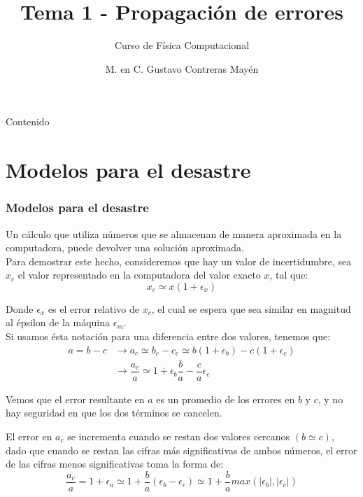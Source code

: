 \documentclass[12pt]{beamer}
\title{Tema 1 - Propagaci\'{o}n de errores}
\subtitle{Curso de F\'{i}sica Computacional}
\author{M. en C. Gustavo Contreras May\'{e}n}
\date{}
\begin{document}
\maketitle
\fontsize{14}{14}\selectfont
{}
\begin{frame}{Contenido}
\tableofcontents[pausesections]
\end{frame}
\section{Modelos para el desastre}
\begin{frame}
\frametitle{Modelos para el desastre}
Un c\'{a}lculo que utiliza n\'{u}meros que se almacenan de manera aproximada en la computadora, puede devolver una soluci\'{o}n aproximada.
\\
\bigskip
Para demostrar este hecho, consideremos que hay un valor de incertidumbre, sea $x_{c}$ el valor representado en la computadora del valor exacto $x$, tal que:
\[x_{c} \simeq  x(1+\epsilon_{x}) \]
\end{frame}
\begin{frame}
Donde $\epsilon_{x}$ es el error relativo de $x_{c}$, el cual se espera que sea similar en magnitud al \'{e}psilon de la m\'{a}quina $\epsilon_{m}$.
\\
\bigskip
Si usamos \'{e}sta notación para una diferencia entre dos valores, tenemos que:
\begin{eqnarray*}
a=b-c & \rightarrow a_{c} \simeq b_{c} - c_{c} \simeq b(1+\epsilon_{b}) - c(1+\epsilon_{c}) \\
{} & \rightarrow \dfrac{a_{c}}{a} \simeq 1 + \epsilon_{b} \dfrac{b}{a} - \dfrac{c}{a} \epsilon_{c}
\end{eqnarray*} 
\end{frame}
\begin{frame}
Vemos que el error resultante en $a$ es un promedio de los errores en $b$ y $c$, y no hay seguridad en que los dos t\'{e}rminos se cancelen.
\end{frame}
\begin{frame}
El error en $a_{c}$ se incrementa cuando se restan dos valores cercanos $(b \simeq c)$, dado que cuando se restan las cifras m\'{a}s significativas de ambos n\'{u}meros, el error de las cifras menos significativas toma la forma de:
\[ \dfrac{a_{c}}{a}=1+\epsilon_{a} \simeq 1 + \dfrac{b}{a}(\epsilon_{b} - \epsilon_{c}) \simeq 1 + \dfrac{b}{a} max(\vert \epsilon_{b} \vert, \vert \epsilon_{c} \vert) \]
\end{frame}
\end{document}
